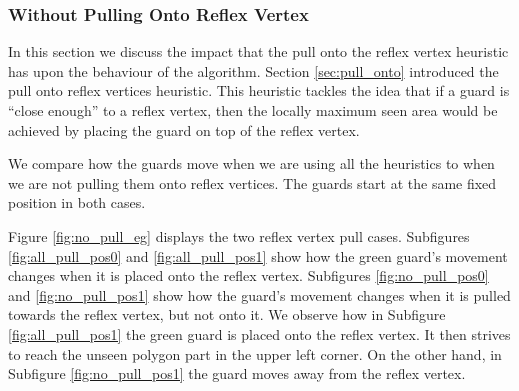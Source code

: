 \subsubsection{Without Pulling Onto Reflex Vertex}
In this section we discuss the impact that the pull onto the reflex vertex heuristic has upon the behaviour of the algorithm. Section \ref{sec:pull_onto} introduced the pull onto reflex vertices heuristic. This heuristic tackles the idea that if a guard is ``close enough'' to a reflex vertex, then the locally maximum seen area would be achieved by placing the guard on top of the reflex vertex. 

We  compare how the guards move when we are using all the heuristics to when we are not pulling them onto reflex vertices. The guards  start at the same fixed position in both cases.

Figure \ref{fig:no_pull_eg} displays the two reflex vertex pull cases. Subfigures \ref{fig:all_pull_pos0} and \ref{fig:all_pull_pos1} show how the green guard's movement changes when it is placed onto the reflex vertex. Subfigures \ref{fig:no_pull_pos0} and \ref{fig:no_pull_pos1} show how the guard's movement changes when it is pulled towards the reflex vertex, but not onto it. We  observe how in Subfigure \ref{fig:all_pull_pos1} the green guard is placed onto the reflex vertex. It then strives to reach the unseen polygon part in the upper left corner. On the other hand, in Subfigure \ref{fig:no_pull_pos1} the guard moves away from the reflex vertex.

